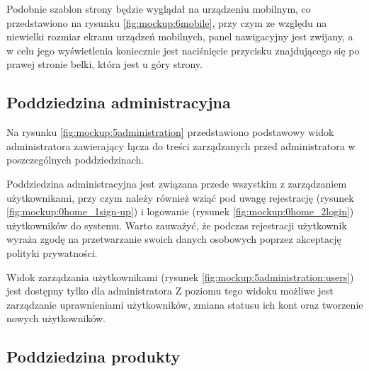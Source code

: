 
Podobnie szablon strony będzie wyglądał na urządzeniu mobilnym, co przedstawiono na rysunku \ref{fig:mockup:6mobile},
przy czym ze względu na niewielki rozmiar ekranu urządzeń mobilnych, panel nawigacyjny jest zwijany,
a w celu jego wyświetlenia koniecznie jest naciśnięcie przycisku znajdującego się po prawej stronie belki, która jest u góry strony.


\subsection{Poddziedzina administracyjna}

Na rysunku \ref{fig:mockup:5administration} przedstawiono podstawowy widok administratora zawierający łącza do treści zarządzanych przed administratora w poszczególnych poddziedzinach.


Poddziedzina administracyjna jest związana przede wszystkim z zarządzaniem użytkownikami,
przy czym należy również wziąć pod uwagę rejestrację (rysunek \ref{fig:mockup:0home_1sign-up}) i logowanie (rysunek \ref{fig:mockup:0home_2login}) użytkowników do systemu.
Warto zauważyć, że podczas rejestracji użytkownik wyraża zgodę na przetwarzanie swoich danych osobowych poprzez akceptację polityki prywatności.



Widok zarządzania użytkownikami (rysunek \ref{fig:mockup:5administration:users}) jest dostępny tylko dla administratora
Z poziomu tego widoku możliwe jest zarządzanie uprawnieniami użytkowników, zmiana statusu ich kont oraz tworzenie nowych użytkowników.


\subsection{Poddziedzina produkty}


